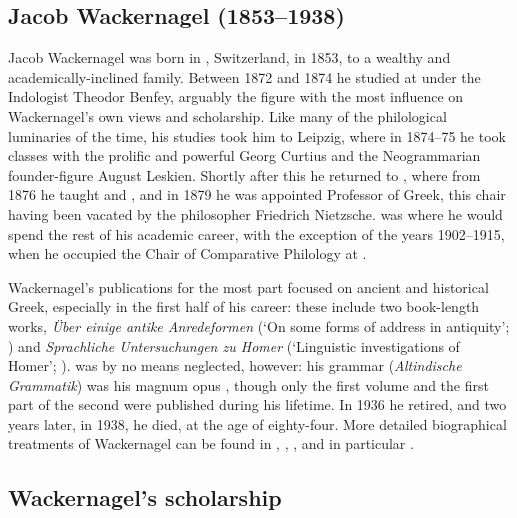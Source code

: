 \documentclass[output=paper]{../langscibook}
\begin{document}
\subsection{Jacob Wackernagel (1853--1938)}
Jacob Wackernagel was born in , Switzerland, in 1853, to a wealthy and academically-inclined family. Between 1872 and 1874 he studied at  under the Indologist Theodor Benfey, arguably the figure with the most influence on Wackernagel's own views and scholarship. Like many of the philological luminaries of the time, his studies took him to Leipzig, where in 1874--75 he took classes with the prolific and powerful Georg Curtius and the Neogrammarian founder-figure August Leskien. Shortly after this he returned to , where from 1876 he taught  and , and in 1879 he was appointed Professor of Greek, this chair having been vacated by the philosopher Friedrich Nietzsche.  was where he would spend the rest of his academic career, with the exception of the years 1902--1915, when he occupied the Chair of Comparative Philology at .

Wackernagel's publications for the most part focused on ancient and historical Greek, especially in the first half of his career: these include two book-length works, \emph{Über einige antike Anredeformen} (`On some forms of address in antiquity'; \citeyear{Wackernagel1912}) and \emph{Sprachliche Untersuchungen zu Homer} (`Linguistic investigations of Homer'; \citeyear{Wackernagel1916}).  was by no means neglected, however: his  grammar (\emph{Altindische Grammatik}) was his magnum opus \citep[x]{Langslow2009}, though only the first volume \citeyearpar{Wackernagel1896} and the first part of the second \citeyearpar{Wackernagel1905} were published during his lifetime. In 1936 he retired, and two years later, in 1938, he died, at the age of eighty-four. More detailed biographical treatments of Wackernagel can be found in \citet{Schwyzer1938}, \citet{Schlerath1990}, \citet[viii--xviii]{Langslow2009}, and in particular \citet{Schmitt1990}.

\subsection{Wackernagel's scholarship}
\end{document}
